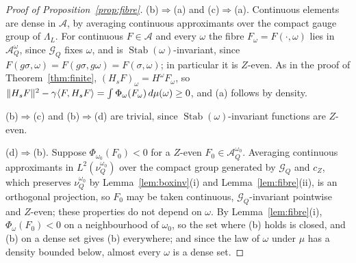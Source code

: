 \begin{proof}[Proof of Proposition~\ref{prop:fibre}]
(b)$\Rightarrow$(a) and (c)$\Rightarrow$(a). Continuous elements are dense in
$\mathcal A$, by averaging continuous approximants over the compact gauge
group of $\Lambda_L$. For continuous $F\in\mathcal A$ and every $\omega$ the
fibre $F_\omega=F(\cdot,\omega)$ lies in $\mathcal A^\omega_Q$, since $\mathcal
G_Q$ fixes $\omega$, and is $\operatorname{Stab}(\omega)$-invariant, since
$F(g\sigma,\omega)=F(g\sigma,g\omega)=F(\sigma,\omega)$; in particular it is
$Z$-even. As in the proof of Theorem~\ref{thm:finite}, $(H_sF)_\omega=H^\omega
F_\omega$, so $\|H_sF\|^2-\gamma\langle F,H_sF\rangle=\int\Phi_\omega(F_\omega)\,d\mu(
\omega)\ge0$, and (a) follows by density.

(b)$\Rightarrow$(c) and (b)$\Rightarrow$(d) are trivial, since
$\operatorname{Stab}(\omega)$-invariant functions are $Z$-even.

(d)$\Rightarrow$(b). Suppose $\Phi_{\omega_0}(F_0)<0$ for a $Z$-even $F_0\in
\mathcal A^{\omega_0}_Q$. Averaging continuous approximants in $L^2(\nu^{
\omega_0}_Q)$ over the compact group generated by $\mathcal G_Q$ and $c_Z$,
which preserves $\nu^{\omega_0}_Q$ by Lemma~\ref{lem:boxinv}(i) and
Lemma~\ref{lem:fibre}(ii), is an orthogonal projection, so $F_0$ may be
taken continuous, $\mathcal G_Q$-invariant pointwise and $Z$-even; these
properties do not depend on $\omega$. By Lemma~\ref{lem:fibre}(i), $\Phi_
\omega(F_0)<0$ on a neighbourhood of $\omega_0$, so the set where (b) holds
is closed, and (b) on a dense set gives (b) everywhere; and since the law
of $\omega$ under $\mu$ has a density bounded below, almost every $\omega$
is a dense set.


\end{proof}
